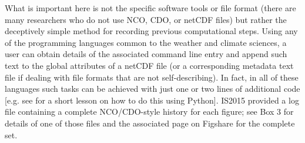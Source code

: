 What is important here is not the specific software tools or file format (there are many researchers who do not use NCO, CDO, or netCDF files) but rather the deceptively simple method for recording previous computational steps. Using any of the programming languages common to the weather and climate sciences, a user can obtain details of the associated command line entry and append such text to the global attributes of a netCDF file (or a corresponding metadata text file if dealing with file formats that are not self-describing). In fact, in all of these languages such tasks can be achieved with just one or two lines of additional code [e.g. see \citet{Irving2015a} for a short lesson on how to do this using Python]. IS2015 provided a log file containing a complete NCO/CDO-style history for each figure; see Box 3 for details of one of those files and the associated page on Figshare for the complete set.

